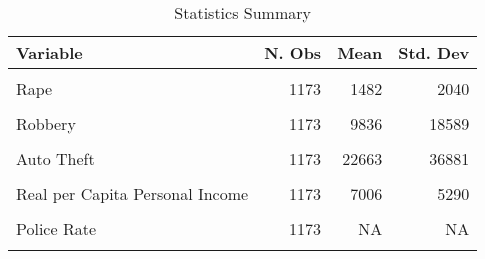 \begin{table}[!h]

\caption{Statistics Summary}
\centering
\begin{tabular}[t]{l|r|r|r}
\toprule
Variable & N. Obs & Mean & Std. Dev\\
\midrule
\cellcolor{gray!6}{Murder} & \cellcolor{gray!6}{1173} & \cellcolor{gray!6}{401} & \cellcolor{gray!6}{561}\\
Rape & 1173 & 1482 & 2040\\
\cellcolor{gray!6}{Aggravated Assault} & \cellcolor{gray!6}{1173} & \cellcolor{gray!6}{13295} & \cellcolor{gray!6}{21062}\\
Robbery & 1173 & 9836 & 18589\\
\cellcolor{gray!6}{Burglary} & \cellcolor{gray!6}{1173} & \cellcolor{gray!6}{60343} & \cellcolor{gray!6}{81349}\\
Auto Theft & 1173 & 22663 & 36881\\
\cellcolor{gray!6}{Larceny} & \cellcolor{gray!6}{1173} & \cellcolor{gray!6}{127203} & \cellcolor{gray!6}{157918}\\
Real per Capita Personal Income & 1173 & 7006 & 5290\\
\cellcolor{gray!6}{Unemployment Rate} & \cellcolor{gray!6}{1173} & \cellcolor{gray!6}{NA} & \cellcolor{gray!6}{NA}\\
Police Rate & 1173 & NA & NA\\
\cellcolor{gray!6}{Population Density} & \cellcolor{gray!6}{1173} & \cellcolor{gray!6}{363} & \cellcolor{gray!6}{1487}\\
\bottomrule
\end{tabular}
\end{table}